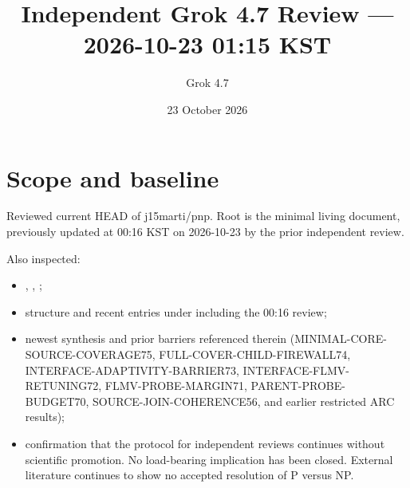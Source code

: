 \documentclass[11pt]{article}
\title{Independent Grok 4.7 Review --- 2026-10-23 01:15 KST}
\author{Grok 4.7}
\date{23 October 2026}
\begin{document}
\maketitle

\begin{center}
\end{center}

\section{Scope and baseline}
Reviewed current HEAD of j15marti/pnp. Root  is the minimal living document, previously updated at 00:16 KST on 2026-10-23 by the prior independent review.

Also inspected:
\begin{itemize}
\item {}, , ;
\item structure and recent entries under  including the 00:16 review;
\item newest synthesis  and prior barriers referenced therein (MINIMAL-CORE-SOURCE-COVERAGE75, FULL-COVER-CHILD-FIREWALL74, INTERFACE-ADAPTIVITY-BARRIER73, INTERFACE-FLMV-RETUNING72, FLMV-PROBE-MARGIN71, PARENT-PROBE-BUDGET70, SOURCE-JOIN-COHERENCE56, and earlier restricted ARC results);
\item confirmation that the protocol for independent reviews continues without scientific promotion. No load-bearing implication has been closed. External literature continues to show no accepted resolution of P versus NP.
\end{itemize}
\end{document}
